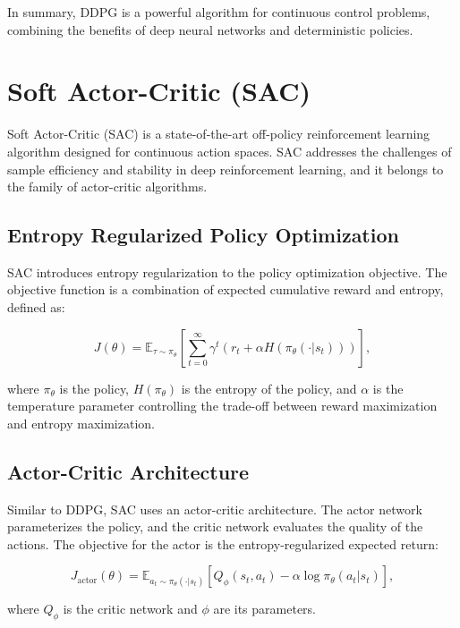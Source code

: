 \documentclass[conference]{IEEEtran}
\begin{document}
In summary, DDPG is a powerful algorithm for continuous control problems, combining the benefits of deep neural networks and deterministic policies.

\section{Soft Actor-Critic (SAC)}

Soft Actor-Critic (SAC) is a state-of-the-art off-policy reinforcement learning algorithm designed for continuous action spaces. SAC addresses the challenges of sample efficiency and stability in deep reinforcement learning, and it belongs to the family of actor-critic algorithms.

\subsection{Entropy Regularized Policy Optimization}

SAC introduces entropy regularization to the policy optimization objective. The objective function is a combination of expected cumulative reward and entropy, defined as:

\begin{equation}
J(\theta) = \mathbb{E}_{\tau \sim \pi_{\theta}} \left[ \sum_{t=0}^{\infty} \gamma^t \left( r_t + \alpha H(\pi_{\theta}(\cdot|s_t)) \right) \right],
\end{equation}

where $\pi_{\theta}$ is the policy, $H(\pi_{\theta})$ is the entropy of the policy, and $\alpha$ is the temperature parameter controlling the trade-off between reward maximization and entropy maximization.

\subsection{Actor-Critic Architecture}

Similar to DDPG, SAC uses an actor-critic architecture. The actor network parameterizes the policy, and the critic network evaluates the quality of the actions. The objective for the actor is the entropy-regularized expected return:

\begin{equation}
J_{\text{actor}}(\theta) = \mathbb{E}_{a_t \sim \pi_{\theta}(\cdot|s_t)} \left[ Q_{\phi}(s_t, a_t) - \alpha \log \pi_{\theta}(a_t|s_t) \right],
\end{equation}

where $Q_{\phi}$ is the critic network and $\phi$ are its parameters.
\end{document}
